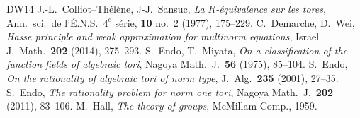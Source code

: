 \documentclass[12pt]{amsart}
\theoremstyle{plain}
\theoremstyle{definition}
\numberwithin{thm}{section}
\numberwithin{equation}{section}
\begin{document}
\begin{thebibliography}{DW14}
J.-L.~Colliot--Th{\'e}l{\`e}ne, J-J.~Sansuc, \emph{La $R$-{\'e}quivalence sur les tores}, Ann.~sci.~de l'{\'E}.N.S.~$4^{e}$ s{\'e}rie, \textbf{10} no.~2 (1977), 175--229. 
C.~Demarche, D.~Wei, \emph{Hasse principle and weak approximation for multinorm equations}, Israel J.~Math.~\textbf{202} (2014), 275--293. 
S.~Endo, T.~Miyata, \emph{On a classification of the function fields of algebraic tori}, Nagoya Math.~J.~\textbf{56} (1975), 85--104. 
S.~Endo, \emph{On the rationality of algebraic tori of norm type}, J.~Alg.~\textbf{235} (2001), 27--35. 
S.~Endo, \emph{The rationality problem for norm one tori}, Nagoya Math.~J.~\textbf{202} (2011), 83--106. 
M.~Hall, \emph{The theory of groups}, McMillam Comp., 1959. 

\end{thebibliography}
\end{document}
